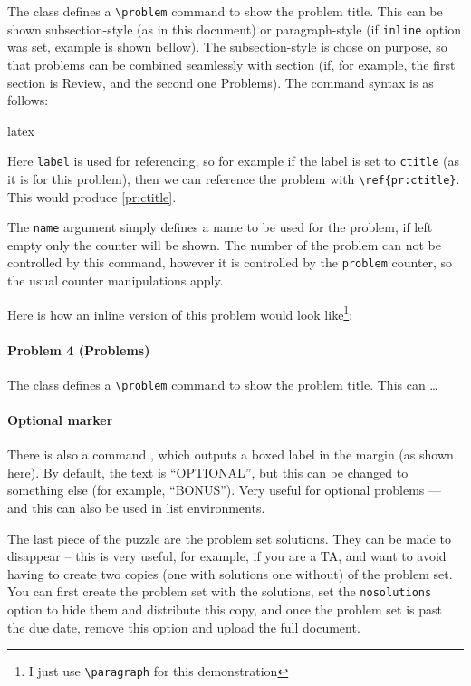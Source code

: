 \documentclass{pset}
\theoremstyle{remark}
\begin{document}
The class defines a \texttt{\textbackslash{}problem} command to show the problem title. This can be shown subsection-style (as in this document) or paragraph-style (if \texttt{inline} option was set, example is shown bellow). The subsection-style is chose on purpose, so that problems can be combined seamlessly with section (if, for example, the first section is Review, and the second one Problems). The command syntax is as follows:
\begin{tminted}{latex}
\end{tminted}
Here \texttt{label} is used for referencing, so for example if the label is set to \texttt{ctitle} (as it is for this problem), then we can reference the problem with \texttt{\textbackslash{}ref\{pr:ctitle\}}. This would produce \ref{pr:ctitle}. 

The \texttt{name} argument simply defines a name to be used for the problem, if left empty only the counter will be shown. The number of the problem can not be controlled by this command, however it is controlled by the \texttt{problem} counter, so the usual counter manipulations apply.

Here is how an inline version of this problem would look like\footnote{I just use \texttt{\textbackslash{}paragraph} for this demonstration}:

\paragraph{\textsf{Problem 4 (Problems)}}
The class defines a \texttt{\textbackslash{}problem} command to show the problem title. This can \ldots

\paragraph{Optional marker\optional} There is also a command , which outputs a boxed label in the margin (as shown here). By default, the text is ``OPTIONAL'', but this can be changed to something else (for example, ``BONUS''). Very useful for optional problems --- and this can also be used in list environments.


The last piece of the puzzle are the problem set solutions. They can be made to disappear -- this is very useful, for example, if you are a TA, and want to avoid having to create two copies (one with solutions one without) of the problem set. You can first create the problem set with the solutions, set the \texttt{nosolutions} option to hide them and distribute this copy, and once the problem set is past the due date, remove this option and upload the full document.
\end{document}
